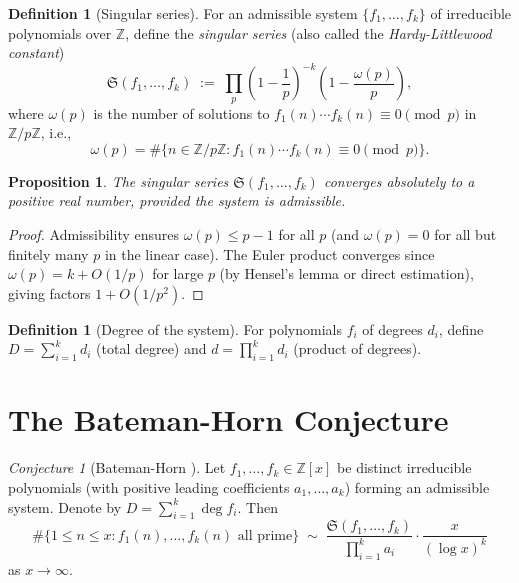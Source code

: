 \documentclass[12pt,a4paper]{amsart}
\newtheorem{proposition}[theorem]{Proposition}
\theoremstyle{definition}
\newtheorem{definition}[theorem]{Definition}
\theoremstyle{remark}
\newtheorem{conjecture}[theorem]{Conjecture}
\newcommand{\Z}{\mathbb{Z}}
\newcommand{\BH}{\mathfrak{S}}
\begin{document}
\begin{definition}[Singular series]
  For an admissible system $\{f_1,\ldots,f_k\}$ of irreducible polynomials over $\Z$,
  define the \emph{singular series} (also called the \emph{Hardy-Littlewood constant})
  \[
    \BH(f_1,\ldots,f_k) \;:=\;
    \prod_p \left(1 - \frac{1}{p}\right)^{-k} \left(1 - \frac{\omega(p)}{p}\right),
  \]
  where $\omega(p)$ is the number of solutions to
  $f_1(n)\cdots f_k(n) \equiv 0 \pmod{p}$
  in $\Z/p\Z$, i.e.,
  \[
    \omega(p) = \#\{n \in \Z/p\Z : f_1(n)\cdots f_k(n) \equiv 0 \pmod{p}\}.
  \]
\end{definition}

\begin{proposition}
  The singular series $\BH(f_1,\ldots,f_k)$ converges absolutely to a positive
  real number, provided the system is admissible.
\end{proposition}

\begin{proof}
  Admissibility ensures $\omega(p) \leq p-1$ for all $p$ (and $\omega(p) = 0$ for
  all but finitely many $p$ in the linear case). The Euler product converges since
  $\omega(p) = k + O(1/p)$ for large $p$ (by Hensel's lemma or direct estimation),
  giving factors $1 + O(1/p^2)$.
\end{proof}

\begin{definition}[Degree of the system]
  For polynomials $f_i$ of degrees $d_i$, define $D = \sum_{i=1}^k d_i$ (total degree)
  and $d = \prod_{i=1}^k d_i$ (product of degrees).
\end{definition}

\section{The Bateman-Horn Conjecture}\label{sec:bh_conjecture}

\begin{conjecture}[Bateman-Horn \cite{BH1962}]\label{conj:BH}
  Let $f_1, \ldots, f_k \in \Z[x]$ be distinct irreducible polynomials (with positive
  leading coefficients $a_1, \ldots, a_k$) forming an admissible system. Denote by
  $D = \sum_{i=1}^k \deg f_i$.
  Then
  \[
    \#\{1 \leq n \leq x : f_1(n),\ldots,f_k(n) \text{ all prime}\}
    \;\sim\;
    \frac{\BH(f_1,\ldots,f_k)}{\prod_{i=1}^k a_i}
    \cdot \frac{x}{(\log x)^k}
  \]
  as $x \to \infty$.
\end{conjecture}
\end{document}
